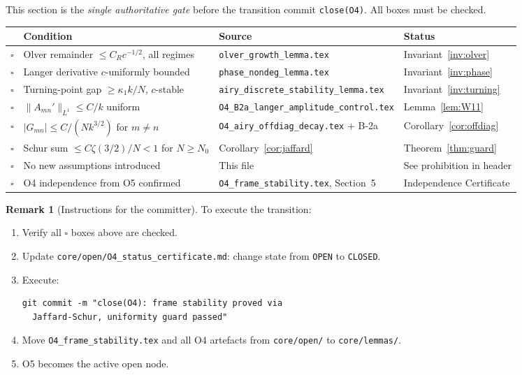 \documentclass[12pt,a4paper]{amsart}
\theoremstyle{definition}
\newtheorem{remark}[theorem]{Remark}
\begin{document}
This section is the \emph{single authoritative gate}
before the transition commit \texttt{close(O4)}.
All boxes must be checked.

\begin{center}
\renewcommand{\arraystretch}{1.4}
\begin{tabular}{clll}
\toprule
 & \textbf{Condition} & \textbf{Source} & \textbf{Status} \\
\midrule
$\square$ & Olver remainder $\leq C_R c^{-1/2}$, all regimes
  & \texttt{olver\_growth\_lemma.tex} & Invariant~\ref{inv:olver} \\
$\square$ & Langer derivative $c$-uniformly bounded
  & \texttt{phase\_nondeg\_lemma.tex} & Invariant~\ref{inv:phase} \\
$\square$ & Turning-point gap $\geq \kappa_1 k/N$, $c$-stable
  & \texttt{airy\_discrete\_stability\_lemma.tex} & Invariant~\ref{inv:turning} \\
$\square$ & $\|A_{mn}'\|_{L^1} \leq C/k$ uniform
  & \texttt{O4\_B2a\_langer\_amplitude\_control.tex} & Lemma~\ref{lem:W11} \\
$\square$ & $|G_{mn}| \leq C/(Nk^{3/2})$ for $m\neq n$
  & \texttt{O4\_airy\_offdiag\_decay.tex} + B-2a & Corollary~\ref{cor:offdiag} \\
$\square$ & Schur sum $\leq C\zeta(3/2)/N < 1$ for $N\geq N_0$
  & Corollary~\ref{cor:jaffard} & Theorem~\ref{thm:guard} \\
$\square$ & No new assumptions introduced
  & This file & See prohibition in header \\
$\square$ & O4 independence from O5 confirmed
  & \texttt{O4\_frame\_stability.tex}, Section~5 & Independence Certificate \\
\bottomrule
\end{tabular}
\end{center}

\begin{remark}[Instructions for the committer]
To execute the transition:
\begin{enumerate}
  \item Verify all $\square$ boxes above are checked.
  \item Update \texttt{core/open/O4\_status\_certificate.md}:
        change state from \texttt{OPEN} to \texttt{CLOSED}.
  \item Execute:
\begin{verbatim}
git commit -m "close(O4): frame stability proved via
  Jaffard-Schur, uniformity guard passed"
\end{verbatim}
  \item Move \texttt{O4\_frame\_stability.tex} and all O4 artefacts
        from \texttt{core/open/} to \texttt{core/lemmas/}.
  \item O5 becomes the active open node.
\end{enumerate}
\end{remark}
\end{document}
